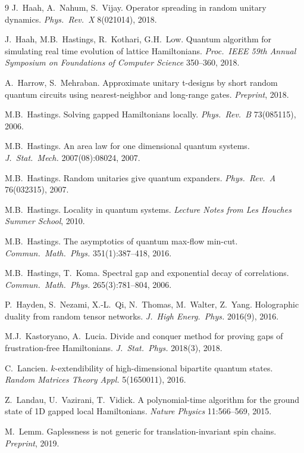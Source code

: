 \documentclass{amsart}
\begin{document}
\begin{thebibliography}{9}
     J.~Haah, A.~Nahum, S.~Vijay. Operator spreading in random unitary dynamics. \textit{Phys.~Rev.~X} 8(021014), 2018.

     J.~Haah, M.B.~Hastings, R.~Kothari, G.H.~Low. Quantum algorithm for simulating real time evolution of lattice Hamiltonians. \textit{Proc.~IEEE 59th Annual Symposium on Foundations of Computer Science} 350--360, 2018.

     A.~Harrow, S.~Mehraban. Approximate unitary t-designs by short random quantum circuits using nearest-neighbor and long-range gates. \textit{Preprint}, 2018.

     M.B.~Hastings. Solving gapped Hamiltonians locally. \textit{Phys.~Rev.~B} 73(085115), 2006.

     M.B.~Hastings. An area law for one dimensional quantum systems. \textit{J.~Stat.~Mech.} 2007(08):08024, 2007.

     M.B.~Hastings. Random unitaries give quantum expanders. \textit{Phys.~Rev.~A} 76(032315), 2007.

     M.B.~Hastings. Locality in quantum systems. \textit{Lecture Notes from Les Houches Summer School}, 2010.

     M.B.~Hastings. The asymptotics of quantum max-flow min-cut. \textit{Commun.~Math.~Phys.} 351(1):387--418, 2016.

     M.B.~Hastings, T.~Koma. Spectral gap and exponential decay of correlations. \textit{Commun.~Math.~Phys.} 265(3):781--804, 2006.

     P.~Hayden, S.~Nezami, X.-L.~Qi, N.~Thomas, M.~Walter, Z.~Yang. Holographic duality from random tensor networks. \textit{J.~High Energ.~Phys.} 2016(9), 2016.

     M.J.~Kastoryano, A.~Lucia. Divide and conquer method for proving gaps of frustration-free Hamiltonians. \textit{J.~Stat.~Phys.} 2018(3), 2018.

     C.~Lancien. $k$-extendibility of high-dimensional bipartite quantum states. \textit{Random Matrices Theory Appl.} 5(1650011), 2016.

     Z.~Landau, U.~Vazirani, T.~Vidick. A polynomial-time algorithm for the ground state of 1D gapped local Hamiltonians. \textit{Nature Physics} 11:566--569, 2015.

     M.~Lemm. Gaplessness is not generic for translation-invariant spin chains. \textit{Preprint}, 2019.


\end{thebibliography}
\end{document}
